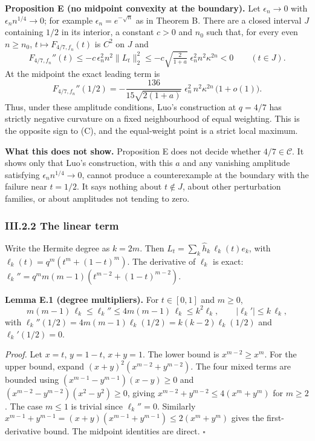 \documentclass[
  british,
  10pt,
]{article}
\begin{document}
\textbf{Proposition E (no midpoint convexity at the boundary).} Let
\(\epsilon_n\to0\) with \(\epsilon_nn^{1/4}\to0\); for example
\(\epsilon_n=e^{-\sqrt n}\) as in Theorem B. There are a closed interval
\(J\) containing \(1/2\) in its interior, a constant \(c>0\) and \(n_0\)
such that, for every even \(n\ge n_0\), \(t\mapsto F_{4/7,f_n}(t)\) is
\(C^2\) on \(J\) and \[
F_{4/7,f_n}''(t)\le-c\,\epsilon_n^2n^2\|L_t\|_2^2\le-c\sqrt{\tfrac{2}{1+a}}\;\epsilon_n^2n^2\kappa^{2n}<0
\qquad(t\in J).
\tag{E2}
\] At the midpoint the exact leading term is \[
F_{4/7,f_n}''(1/2)=-\frac{136}{15\sqrt{2(1+a)}}\;\epsilon_n^2\,n^2\kappa^{2n}\,\bigl(1+o(1)\bigr).
\tag{E3}
\] Thus, under these amplitude conditions, Luo's construction at
\(q=4/7\) has strictly negative curvature on a fixed neighbourhood of
equal weighting. This is the opposite sign to (C), and the equal-weight
point is a strict local maximum.

\textbf{What this does not show.} Proposition E does not decide whether
\(4/7\in\mathcal C\). It shows only that Luo's construction, with this
\(a\) and any vanishing amplitude satisfying \(\epsilon_nn^{1/4}\to0\),
cannot produce a counterexample at the boundary with the failure near
\(t=1/2\). It says nothing about \(t\notin J\), about other perturbation
families, or about amplitudes not tending to zero.

\subsubsection{III.2.2 The linear term}\label{iii.2.2-the-linear-term}

Write the Hermite degree as \(k=2m\). Then
\(L_t=\sum_k\hat h_k\,\ell_k(t)e_k\), with
\(\ell_k(t)=q^m(t^m+(1-t)^m)\). The derivative of \(\ell_k\) is exact:
\(\ell_k''=q^mm(m-1)(t^{m-2}+(1-t)^{m-2})\).

\textbf{Lemma E.1 (degree multipliers).} For \(t\in[0,1]\) and
\(m\ge0\), \[
m(m-1)\,\ell_k\le\ell_k''\le4m(m-1)\,\ell_k\le k^2\ell_k,\qquad |\ell_k'|\le k\,\ell_k,
\tag{E4}
\] with \(\ell_k''(1/2)=4m(m-1)\ell_k(1/2)=k(k-2)\ell_k(1/2)\) and
\(\ell_k'(1/2)=0\).

\emph{Proof.} Let \(x=t\), \(y=1-t\), \(x+y=1\). The lower bound is
\(x^{m-2}\ge x^m\). For the upper bound, expand
\((x+y)^2(x^{m-2}+y^{m-2})\). The four mixed terms are bounded using
\((x^{m-1}-y^{m-1})(x-y)\ge0\) and \((x^{m-2}-y^{m-2})(x^2-y^2)\ge0\),
giving \(x^{m-2}+y^{m-2}\le4(x^m+y^m)\) for \(m\ge2\). The case
\(m\le1\) is trivial since \(\ell_k''=0\). Similarly
\(x^{m-1}+y^{m-1}=(x+y)(x^{m-1}+y^{m-1})\le2(x^m+y^m)\) gives the
first-derivative bound. The midpoint identities are direct. \(\square\)
\end{document}
